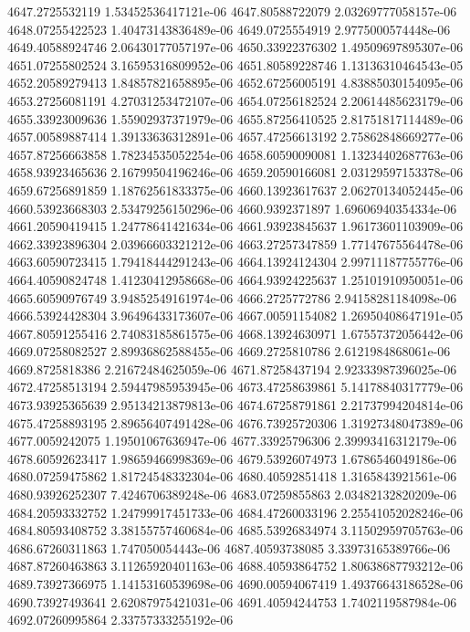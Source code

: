 {4647.2725532119 1.53452536417121e-06
4647.80588722079 2.03269777058157e-06
4648.07255422523 1.40473143836489e-06
4649.0725554919 2.9775000574448e-06
4649.40588924746 2.06430177057197e-06
4650.33922376302 1.49509697895307e-06
4651.07255802524 3.16595316809952e-06
4651.80589228746 1.13136310464543e-05
4652.20589279413 1.84857821658895e-06
4652.67256005191 4.83885030154095e-06
4653.27256081191 4.27031253472107e-06
4654.07256182524 2.20614485623179e-06
4655.33923009636 1.55902937371979e-06
4655.87256410525 2.81751817114489e-06
4657.00589887414 1.39133636312891e-06
4657.47256613192 2.75862848669277e-06
4657.87256663858 1.78234535052254e-06
4658.60590090081 1.13234402687763e-06
4658.93923465636 2.16799504196246e-06
4659.20590166081 2.03129597153378e-06
4659.67256891859 1.18762561833375e-06
4660.13923617637 2.06270134052445e-06
4660.53923668303 2.53479256150296e-06
4660.9392371897 1.69606940354334e-06
4661.20590419415 1.24778641421634e-06
4661.93923845637 1.96173601103909e-06
4662.33923896304 2.03966603321212e-06
4663.27257347859 1.77147675564478e-06
4663.60590723415 1.79418444291243e-06
4664.13924124304 2.99711187755776e-06
4664.40590824748 1.41230412958668e-06
4664.93924225637 1.25101910950051e-06
4665.60590976749 3.94852549161974e-06
4666.2725772786 2.94158281184098e-06
4666.53924428304 3.96496433173607e-06
4667.00591154082 1.26950408647191e-05
4667.80591255416 2.74083185861575e-06
4668.13924630971 1.67557372056442e-06
4669.07258082527 2.89936862588455e-06
4669.2725810786 2.6121984868061e-06
4669.8725818386 2.21672484625059e-06
4671.87258437194 2.92333987396025e-06
4672.47258513194 2.59447985953945e-06
4673.47258639861 5.14178840317779e-06
4673.93925365639 2.95134213879813e-06
4674.67258791861 2.21737994204814e-06
4675.47258893195 2.89656407491428e-06
4676.73925720306 1.31927348047389e-06
4677.0059242075 1.19501067636947e-06
4677.33925796306 2.39993416312179e-06
4678.60592623417 1.98659466998369e-06
4679.53926074973 1.6786546049186e-06
4680.07259475862 1.81724548332304e-06
4680.40592851418 1.3165843921561e-06
4680.93926252307 7.4246706389248e-06
4683.07259855863 2.03482132820209e-06
4684.20593332752 1.24799917451733e-06
4684.47260033196 2.25541052028246e-06
4684.80593408752 3.38155757460684e-06
4685.53926834974 3.11502959705763e-06
4686.67260311863 1.747050054443e-06
4687.40593738085 3.33973165389766e-06
4687.87260463863 3.11265920401163e-06
4688.40593864752 1.80638687793212e-06
4689.73927366975 1.14153160539698e-06
4690.00594067419 1.49376643186528e-06
4690.73927493641 2.62087975421031e-06
4691.40594244753 1.7402119587984e-06
4692.07260995864 2.33757333255192e-06
}
